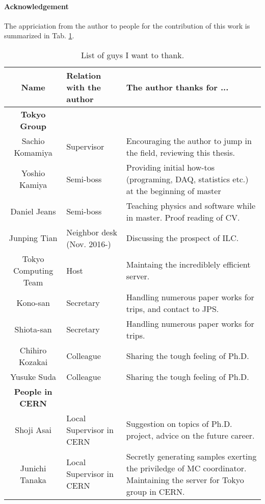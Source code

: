 \paragraph{Acknowledgement} 
The appriciation from the author to people for the contribution of this work is summarized in Tab. \ref{tab::Acknowledgement}.
\begin{table}[h]    
  \centering
  \caption{List of guys I want to thank.}
  \label{tab::Acknowledgement}
  \begin{tabularx}{\linewidth}{clX}

    \toprule
    Name               & Relation with the author        & The author thanks for ... \\
    \midrule
    \midrule
    \textbf{Tokyo Group} & & \\
    \midrule
    Sachio Komamiya    &   Supervisor                  &  Encouraging the author to jump in the field, reviewing this thesis. \\
    Yoshio Kamiya      &   Semi-boss                   &  Providing initial how-tos (programing, DAQ, statistics etc.) at the beginning of master  \\
    Daniel Jeans       &   Semi-boss                   &  Teaching physics and software while in master. Proof reading of CV.  \\
    Junping Tian       &   Neighbor desk (Nov. 2016-)  &  Discussing the prospect of ILC. \\
    Tokyo Computing Team &  Host       & Maintaing the incrediblely efficient server. \\
    Kono-san           &   Secretary   & Handling numerous paper works for trips, and contact to JPS.  \\
    Shiota-san         &   Secretary   & Handling numerous paper works for trips.  \\
    Chihiro Kozakai    &   Colleague   & Sharing the tough feeling of Ph.D.  \\
    Yusuke Suda        &   Colleague   & Sharing the tough feeling of Ph.D.  \\
    \midrule
    \midrule
    \textbf{People in CERN}     &               & \\
    \midrule
    Shoji Asai         &   Local Supervisor in CERN                                                       &  Suggestion on topics of Ph.D. project, advice on the future career.   \\
    Junichi Tanaka     &   Local Supervisor in CERN                                                       &  Secretly generating samples exerting the priviledge of MC coordinator. Maintaining the server for Tokyo group in CERN.   \\

\end{tabularx}
\end{table}
